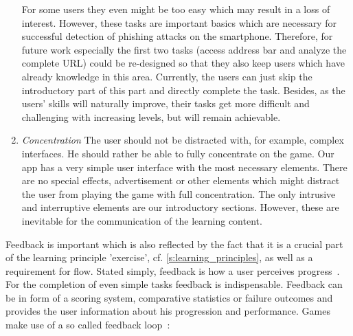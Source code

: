 \begin{description}[leftmargin=0cm]
\begin{enumerate}
For some users they even might be too easy which may result in a loss of interest.
However, these tasks are important basics which are necessary for successful detection of phishing attacks on the smartphone. 
Therefore, for future work especially the first two tasks (access address bar and analyze the complete URL) could be re-designed so that they also keep users which have already knowledge in this area.
Currently, the users can just skip the introductory part of this part and directly complete the task.
Besides, as the users' skills will naturally improve, their tasks get more difficult and challenging with increasing levels, but will remain achievable.
		\item \textit{Concentration} The user should not be distracted with, for example, complex interfaces. 
He should rather be able to fully concentrate on the game. 
Our app has a very simple user interface with the most necessary elements. 
There are no special effects, advertisement or other elements which might distract the user from playing the game with full concentration.
The only intrusive and interruptive elements are our introductory sections. 
However, these are inevitable for the communication of the learning content.
	\end{enumerate}
	\item[Feedback] Feedback is important which is also reflected by the fact that it is a crucial part of the learning principle 'exercise', cf. \autoref{s:learning_principles}, as well as a requirement for flow.
Stated simply, feedback is how a user perceives progress~\cite{csikszentmihalyi1990flow, csikszentmihalyi1997finding}.
For the completion of even simple tasks feedback is indispensable.
Feedback can be in form of a scoring system, comparative statistics or failure outcomes and provides the user information about his progression and performance.
Games make use of a so called feedback loop~\cite{goetz2011harnessing}:


\end{description}
